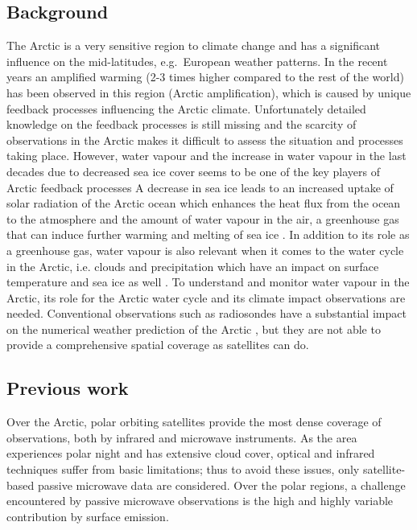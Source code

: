 \documentclass[12pt,oneside,a4paper]{article}
\begin{document}
\subsection{Background}
%
\label{sec:background}
The Arctic is a very sensitive region to climate change and has a significant
influence on the mid-latitudes, e.g.\ European weather patterns. In the recent
years an amplified warming (2-3 times higher compared to the rest of the world)
has been observed in this region (Arctic amplification), which is caused by
unique feedback processes influencing the Arctic climate. Unfortunately
detailed knowledge on the feedback processes is still missing and the scarcity
of observations in the Arctic makes it difficult to assess the situation and
processes taking place. However, water vapour and the increase in water vapour
in the last decades due to decreased sea ice cover seems to be one of the key
players of Arctic feedback processes \citep{serreze:2012:recen,
  vihma:2016:theat} A decrease in sea ice leads to an increased uptake of solar
radiation of the Arctic ocean which enhances the heat flux from the ocean to
the atmosphere and the amount of water vapour in the air, a greenhouse gas that
can induce further warming and melting of sea ice \citep{screen:2010:thece}. In
addition to its role as a greenhouse gas, water vapour is also relevant when it
comes to the water cycle in the Arctic, i.e. clouds and precipitation which
have an impact on surface temperature and sea ice as well
\citep{blanchet:water:1995}. To understand and monitor water vapour in the
Arctic, its role for the Arctic water cycle and its climate impact observations
are needed. Conventional observations such as radiosondes have a substantial
impact on the numerical weather prediction of the Arctic
\citep{lawrence:2019:usean}, but they are not able to provide a comprehensive
spatial coverage as satellites can do.

\subsection{Previous work}
%
\label{sec:previousworks}
%
Over the Arctic, polar orbiting satellites provide the most dense coverage
of observations, both by infrared and microwave instruments. As the area
experiences polar night and has extensive cloud cover, optical and infrared
techniques suffer from basic limitations; thus to avoid these issues, only
satellite-based passive microwave data are considered. Over the polar regions, a
challenge encountered by passive microwave observations is the high and highly
variable contribution by surface emission.
\end{document}
